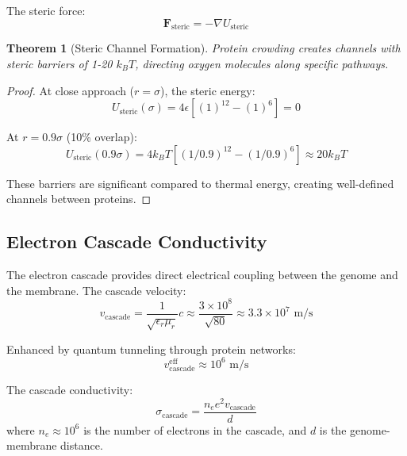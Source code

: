 \documentclass[11pt,twocolumn,a4paper]{article}
\newtheorem{theorem}{Theorem}[section]
\theoremstyle{definition}
\theoremstyle{remark}
\begin{document}
The steric force:
\begin{equation}
\mathbf{F}_{\mathrm{steric}} = -\nabla U_{\mathrm{steric}}
\label{eq:steric_force}
\end{equation}

\begin{theorem}[Steric Channel Formation]
\label{thm:steric_channels}
Protein crowding creates channels with steric barriers of 1-20 $k_B T$, directing oxygen molecules along specific pathways.
\end{theorem}

\begin{proof}
At close approach ($r = \sigma$), the steric energy:
\begin{equation}
U_{\mathrm{steric}}(\sigma) = 4\epsilon[(1)^{12} - (1)^6] = 0
\end{equation}

At $r = 0.9\sigma$ (10\% overlap):
\begin{equation}
U_{\mathrm{steric}}(0.9\sigma) = 4k_B T[(1/0.9)^{12} - (1/0.9)^6] \approx 20 k_B T
\end{equation}

These barriers are significant compared to thermal energy, creating well-defined channels between proteins.
\end{proof}

\subsection{Electron Cascade Conductivity}

The electron cascade provides direct electrical coupling between the genome and the membrane. The cascade velocity:
\begin{equation}
v_{\mathrm{cascade}} = \frac{1}{\sqrt{\epsilon_r \mu_r}} c \approx \frac{3 \times 10^8}{\sqrt{80}} \approx 3.3 \times 10^7 \text{ m/s}
\label{eq:cascade_velocity_base}
\end{equation}

Enhanced by quantum tunneling through protein networks:
\begin{equation}
v_{\mathrm{cascade}}^{\mathrm{eff}} \approx 10^6 \text{ m/s}
\label{eq:cascade_velocity_effective}
\end{equation}

The cascade conductivity:
\begin{equation}
\sigma_{\mathrm{cascade}} = \frac{n_e e^2 v_{\mathrm{cascade}}}{d}
\label{eq:cascade_conductivity}
\end{equation}
where $n_e \approx 10^6$ is the number of electrons in the cascade, and $d$ is the genome-membrane distance.
\end{document}
